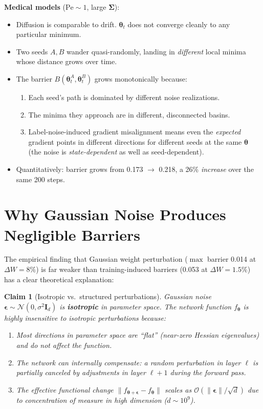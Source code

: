 \documentclass{article}
\newtheorem{claim}{Claim}
\newcommand{\btheta}{\boldsymbol{\theta}}
\newcommand{\bSigma}{\boldsymbol{\Sigma}}
\begin{document}
\noindent\textbf{Medical models} ($\mathrm{Pe} \sim 1$, large $\bSigma$):
\begin{itemize}
\item Diffusion is comparable to drift.  $\btheta_t$ does not converge
      cleanly to any particular minimum.
\item Two seeds $A, B$ wander quasi-randomly, landing in \emph{different}
      local minima whose distance grows over time.
\item The barrier $B(\btheta^A_t, \btheta^B_t)$ grows monotonically because:
      \begin{enumerate}
      \item Each seed's path is dominated by different noise realizations.
      \item The minima they approach are in different, disconnected basins.
      \item Label-noise-induced gradient misalignment means even the
            \emph{expected} gradient points in different directions for
            different seeds at the same $\btheta$ (the noise is
            \emph{state-dependent} as well as seed-dependent).
      \end{enumerate}
\item Quantitatively: barrier grows from 0.173 $\to$ 0.218, a 26\%
      \emph{increase} over the same 200 steps.
\end{itemize}

\section{Why Gaussian Noise Produces Negligible Barriers}

The empirical finding that Gaussian weight perturbation ($\max$ barrier 0.014
at $\Delta W = 8\%$) is far weaker than training-induced barriers (0.053 at
$\Delta W = 1.5\%$) has a clear theoretical explanation:

\begin{claim}[Isotropic vs.\ structured perturbations]
Gaussian noise $\boldsymbol{\epsilon} \sim \mathcal{N}(0, \sigma^2 \mathbf{I}_d)$
is \textbf{isotropic} in parameter space.  The network function $f_\btheta$
is highly insensitive to isotropic perturbations because:
\begin{enumerate}
\item Most directions in parameter space are ``flat'' (near-zero Hessian
      eigenvalues) and do not affect the function.
\item The network can internally compensate: a random perturbation in
      layer $\ell$ is partially canceled by adjustments in layer $\ell+1$
      during the forward pass.
\item The effective functional change $\|f_{\btheta + \boldsymbol{\epsilon}} - f_\btheta\|$
      scales as $\mathcal{O}(\|\boldsymbol{\epsilon}\|/\sqrt{d})$ due to
      concentration of measure in high dimension ($d \sim 10^9$).
\end{enumerate}
\end{claim}
\end{document}
